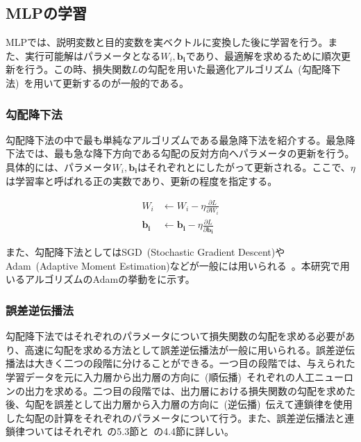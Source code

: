 \clearpage

\subsection{MLPの学習}

MLPでは、説明変数と目的変数を実ベクトルに変換した後に学習を行う。また、実行可能解はパラメータとなる$W_i,\boldsymbol{b_i}$であり、最適解を求めるために順次更新を行う。この時、損失関数$L$の勾配を用いた最適化アルゴリズム~(勾配降下法)~を用いて更新するのが一般的である。

\subsubsection{勾配降下法}
\label{sec:grad}

勾配降下法の中で最も単純なアルゴリズムである最急降下法を紹介する。最急降下法では、最も急な降下方向である勾配の反対方向へパラメータの更新を行う。具体的には、パラメータ$W_i,\boldsymbol{b_i}$はそれぞれとにしたがって更新される。ここで、$\eta$は学習率と呼ばれる正の実数であり、更新の程度を指定する。

\begin{align}
    \label{eq:MLP2_0}
    W _i &\leftarrow W_i - \eta \frac{\partial L}{\partial W_i} \\
    \label{eq:MLP2_1}
    \boldsymbol{b _i} &\leftarrow \boldsymbol{b_i} - \eta \frac{\partial L}{\partial \boldsymbol{b_i}}
\end{align}

また、勾配降下法としてはSGD~(Stochastic Gradient Descent)やAdam~(Adaptive Moment Estimation)などが一般には用いられる~\cite{GradientDescent}。本研究で用いるアルゴリズムのAdamの挙動をに示す。

\subsubsection{誤差逆伝播法}

勾配降下法ではそれぞれのパラメータについて損失関数の勾配を求める必要があり、高速に勾配を求める方法として誤差逆伝播法が一般に用いられる。誤差逆伝播法は大きく二つの段階に分けることができる。一つ目の段階では、与えられた学習データを元に入力層から出力層の方向に~(順伝播)~それぞれの人工ニューロンの出力を求める。二つ目の段階では、出力層における損失関数の勾配を求めた後、勾配を誤差として出力層から入力層の方向に~(逆伝播)~伝えて連鎖律を使用した勾配の計算をそれぞれのパラメータについて行う。また、誤差逆伝播法と連鎖律ついてはそれぞれ~\cite{Bishop}の5.3節と~\cite{Calculus}の4.4節に詳しい。

